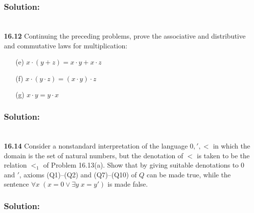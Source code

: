 \documentclass{ctexart}
\begin{document}
\subsubsection*{Solution:}

\section*{}
\textbf{16.12} Continuing the preceding problems, prove the associative and distributive and
commutative laws for multiplication:
\begin{itemize}
	\item[(e)] $x \cdot (y + z) = x \cdot y + x \cdot z$
	\item[(f)] $x \cdot (y \cdot z) = (x \cdot y) \cdot z$
	\item[(g)] $x \cdot y = y \cdot x$
\end{itemize}

\subsubsection*{Solution:}

\section*{}
\textbf{16.14} Consider a nonstandard interpretation of the language ${0, ', <}$ in which the
domain is the set of natural numbers, but the denotation of $<$ is taken to be the
relation $<_1$ of Problem 16.13(a). Show that by giving suitable denotations to
$0$ and $'$, axioms (Q1)–(Q2) and (Q7)–(Q10) of $Q$ can be made true, while the
sentence $\forall x\; (x = 0 \lor \exists y\; x = y')$ is made false.

\subsubsection*{Solution:}
\end{document}

